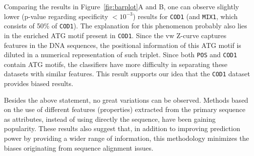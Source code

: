 \documentclass[conference,letterpaper]{IEEEtran}
\begin{document}
Comparing the results in Figure~\ref{fig:barplot}A and B, one can observe slightly lower (p-value regarding specificity $< 10^{-3} $) results for {\tt COD1} (and {\tt MIX1}, which consists of 50\% of {\tt COD1}). The explanation for this phenomenon probably also lies in the enriched ATG motif present in {\tt COD1}. Since the vw Z-curve captures features in the DNA sequences, the positional information of this ATG motif is diluted in a numerical representation of such triplet. Since both {\tt POS} and {\tt COD1} contain ATG motifs, the classifiers have more difficulty in separating these datasets with similar features. This result supports our idea that the {\tt COD1} dataset provides biased results.

Besides the above statement, no great variations can be observed. Methods based on the use of different features (properties) extracted from the primary sequence as attributes, instead of using directly the sequence, have been gaining popularity. These results also suggest that, in addition to improving prediction power by providing a wider range of information, this methodology minimizes the  biases originating from sequence alignment issues. \\
\end{document}
